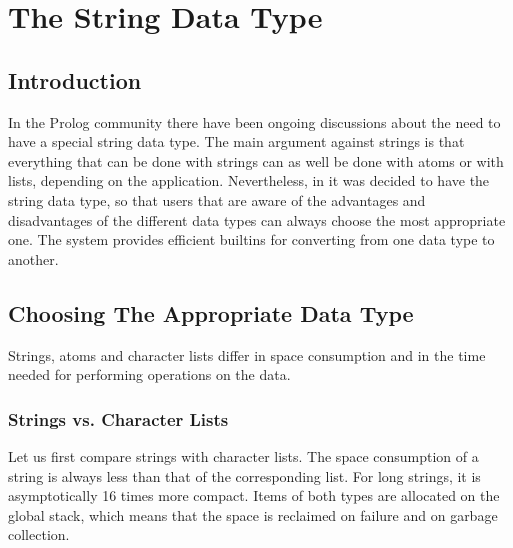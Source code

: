 %
% 
% 
% 
% 
%
%
%
%
%
\chapter{The String Data Type}
\label{chapstring}

\section{Introduction}
In the Prolog community there have been ongoing discussions about the need
to have a special string data type.
The main argument against strings is that everything that can be done
with strings can as well be done with atoms or with lists, depending
on the application.
Nevertheless, in {\eclipse} it was decided to have the string data type, so that
users that are aware of the advantages and disadvantages of the
different data types can always choose the most appropriate one.
The system provides efficient builtins for converting from one data
type to another.

\section{Choosing The Appropriate Data Type}
Strings, atoms and character lists differ in space consumption and in
the time needed for performing operations on the data.

\subsection{Strings vs. Character Lists}
Let us first compare strings with character lists.
The space consumption of a string is always less than that of the corresponding
list. For long strings, it is asymptotically 16 times more compact.
Items of both types are allocated on the global stack, which means that
the space is reclaimed on failure and on garbage collection.

